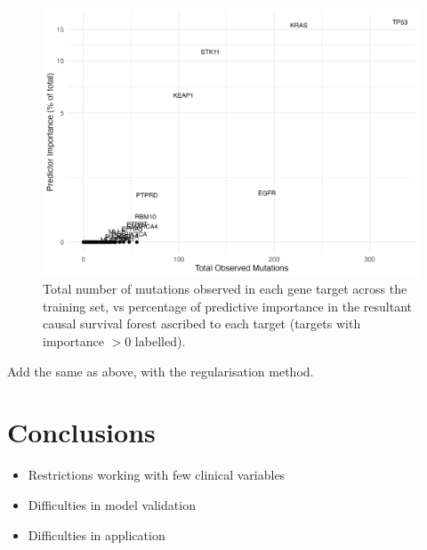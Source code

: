 \documentclass[../thesis.tex]{subfiles}
\begin{document}
\begin{figure}[!tpb] 
\centering
\includegraphics[width=\textwidth]{figures/chapter4/immuno_importance_vs_rate_panel.png}
\caption{Total number of mutations observed in each gene target across the training set, vs  percentage of predictive importance in the resultant causal survival forest ascribed to each target (targets with importance $>0$ labelled).  \label{fig:immuno_importance_vs_rate_panel}}
\end{figure}

{\color{red} Add the same as above, with the regularisation method.}


\section{Conclusions}
{\color{red} \begin{itemize}
    \item Restrictions working with few clinical variables
    \item Difficulties in model validation
    \item Difficulties in application
\end{itemize}}

\dobib %
\end{document}
